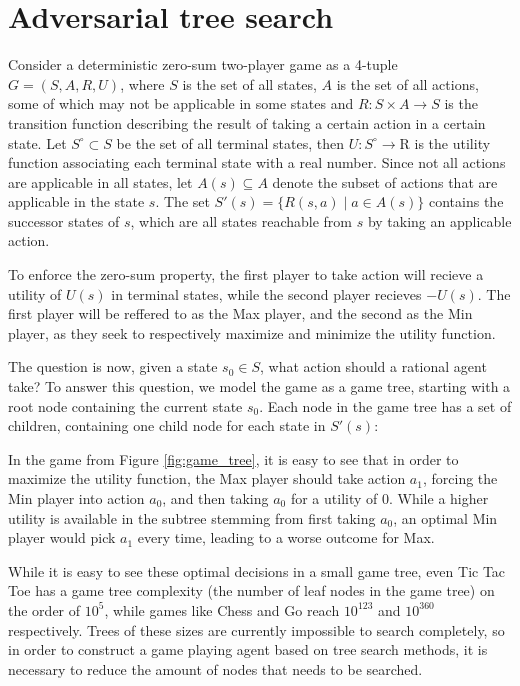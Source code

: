 \section{Adversarial tree search}
\label{sec:theory}

Consider a deterministic zero-sum two-player game as a 4-tuple $G = (S, A, R, U)$, where $S$ is the set of all states, $A$ is the set of all actions, some of which may not be applicable in some states and $R: S \times A \rightarrow S$ is the transition function describing the result of taking a certain action in a certain state. Let $S^\circ \subset S$ be the set of all terminal states, then $U: S^\circ \rightarrow \mathrm{R}$ is the utility function associating each terminal state with a real number. Since not all actions are applicable in all states, let $A(s) \subseteq A$ denote the subset of actions that are applicable in the state $s$. The set $S'(s) = \{ R(s, a) \; | \; a \in A(s) \}$ contains the successor states of $s$, which are all states reachable from $s$ by taking an applicable action.

To enforce the zero-sum property, the first player to take action will recieve a utility of $U(s)$ in terminal states, while the second player recieves $-U(s)$. The first player will be reffered to as the Max player, and the second as the Min player, as they seek to respectively maximize and minimize the utility function.

The question is now, given a state $s_0 \in S$, what action should a rational agent take? To answer this question, we model the game as a game tree, starting with a root node containing the current state $s_0$. Each node in the game tree has a set of children, containing one child node for each state in $S'(s)$:



In the game from Figure \ref{fig:game_tree}, it is easy to see that in order to maximize the utility function, the Max player should take action $a_1$, forcing the Min player into action $a_0$, and then taking $a_0$ for a utility of $0$. While a higher utility is available in the subtree stemming from first taking $a_0$, an optimal Min player would pick $a_1$ every time, leading to a worse outcome for Max.

While it is easy to see these optimal decisions in a small game tree, even Tic Tac Toe has a game tree complexity (the number of leaf nodes in the game tree) on the order of $10^5$, while games like Chess and Go reach $10^{123}$ and $10^{360}$ respectively. Trees of these sizes are currently impossible to search completely, so in order to construct a game playing agent based on tree search methods, it is necessary to reduce the amount of nodes that needs to be searched.

